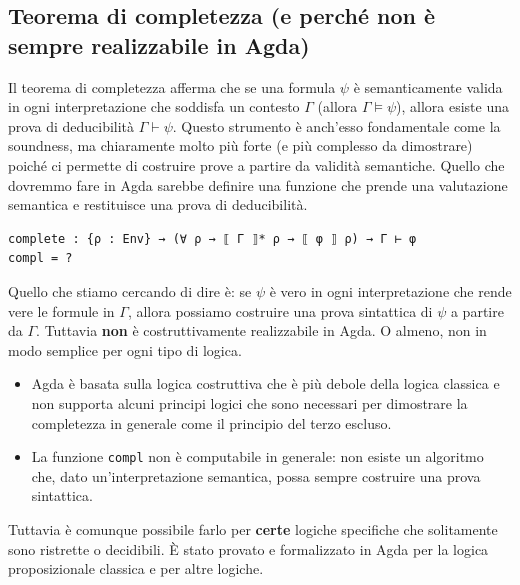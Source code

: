 \documentclass[a4paper]{article}
\theoremstyle{definition}
\theoremstyle{remark}
\begin{document}
\subsection{Teorema di completezza (e perché non è sempre realizzabile in Agda)}

Il teorema di completezza afferma che se una formula \( ψ \) è semanticamente valida in ogni interpretazione che soddisfa un contesto \( Γ \)
(allora \(\Gamma \vDash \psi \)), allora esiste una prova di deducibilità \( \Gamma \vdash \psi \).
Questo strumento è anch'esso fondamentale come la soundness,
ma chiaramente molto più forte (e più complesso da dimostrare) poiché ci permette di costruire prove a partire da validità semantiche.
Quello che dovremmo fare in Agda sarebbe definire una funzione che prende una valutazione semantica 
e restituisce una prova di deducibilità.
\begin{verbatim}
complete : {ρ : Env} → (∀ ρ → ⟦ Γ ⟧* ρ → ⟦ φ ⟧ ρ) → Γ ⊢ φ
compl = ?
\end{verbatim}
Quello che stiamo cercando di dire è: se $\psi$ è vero in ogni interpretazione che rende vere le formule in $\Gamma$,
allora possiamo costruire una prova sintattica di $\psi$ a partire da $\Gamma$.
Tuttavia \textbf{non} è costruttivamente realizzabile in Agda. O almeno, non in modo semplice 
per ogni tipo di logica.
\begin{itemize}
  \item Agda è basata sulla logica costruttiva che è più debole della logica classica e non supporta alcuni principi logici che sono necessari per dimostrare la completezza in generale 
  come il principio del terzo escluso. 
  \item La funzione \texttt{compl} non è computabile in generale: non esiste un algoritmo che, dato un'interpretazione semantica,
  possa sempre costruire una prova sintattica. 
\end{itemize}
Tuttavia è comunque possibile farlo per \textbf{certe} logiche specifiche
che solitamente sono ristrette o decidibili. 
È stato provato e formalizzato in Agda per la logica proposizionale classica \parencite{compThmLeran} e per altre logiche.

\printbibliography
\end{document}
